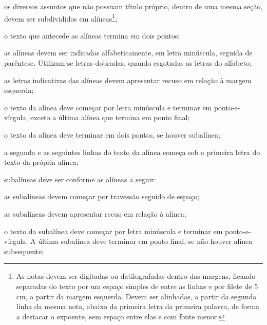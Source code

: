\documentclass[12pt,openright,twoside,a4paper]{abntex2}
\begin{document}
\begin{alineas}

  \item os diversos assuntos que não possuam título próprio, dentro de uma mesma
  seção, devem ser subdivididos em alíneas\footnote{As notas devem ser digitadas ou datilografadas
  dentro das margens, ficando separadas do texto por um espaço simples de entre as
  linhas e por filete de 5 cm, a partir da margem esquerda. Devem ser
  alinhadas, a partir da segunda linha da mesma nota, abaixo da primeira letra
  da primeira palavra, de forma a destacar o expoente, sem espaço entre elas e
  com fonte menor. }; 
  
  \item o texto que antecede as alíneas termina em dois pontos;
  \item as alíneas devem ser indicadas alfabeticamente, em letra minúscula,
  seguida de parêntese. Utilizam-se letras dobradas, quando esgotadas as
  letras do alfabeto;

  \item as letras indicativas das alíneas devem apresentar recuso em relação à
  margem esquerda;

  \item o texto da alínea deve começar por letra minúscula e terminar em
  ponto-e-vírgula, exceto a última alínea que termina em ponto final;

  \item o texto da alínea deve terminar em dois pontos, se houver subalínea;

  \item a segunda e as seguintes linhas do texto da alínea começa sob a
  primeira letra do texto da própria alínea;
  
  \item subalíneas \cite[4.3]{NBR6024:2012} deve ser conforme as alíneas a seguir:

  \begin{alineas}
     \item as subalíneas devem começar por travessão seguido de espaço;

     \item as subalíneas devem apresentar recuo em relação à alínea;

     \item o texto da subalínea deve começar por letra minúscula e terminar em
     ponto-e-vírgula. A última subalínea deve terminar em ponto final, se não
     houver alínea subsequente;


\end{alineas}
\end{alineas}
\end{document}
